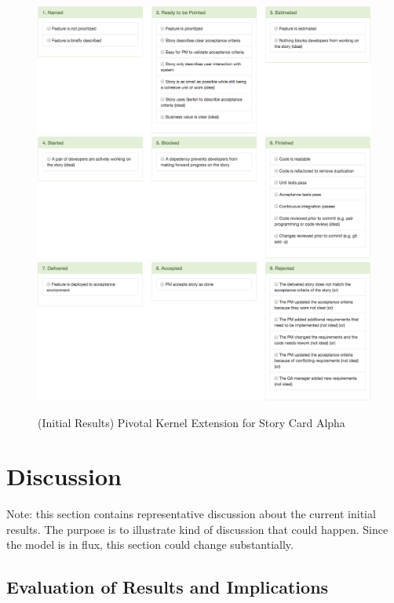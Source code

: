 \documentclass[preprint,12pt,3p]{elsarticle}
\begin{document}
\begin{figure}[ht]
\includegraphics[width=6.25in]{pivotal_images/story_card1}
\includegraphics[width=6.25in]{pivotal_images/story_card2}
\includegraphics[width=6.25in]{pivotal_images/story_card3}
\caption{(Initial Results) Pivotal Kernel Extension for Story Card Alpha}
\label{KernelExtension}
\end{figure}

\section{Discussion}
\label{Discussion}

Note: this section contains representative discussion about the current initial results. The purpose is to illustrate kind of discussion that could happen. Since the model is in flux, this section could change substantially.

\subsection{Evaluation of Results and Implications}
\end{document}
